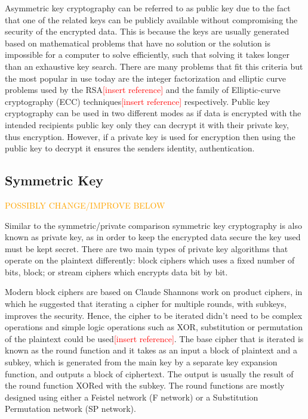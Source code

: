 \documentclass[12pt,twoside,a4paper]{report}
\begin{document}
    Asymmetric key cryptography can be referred to as public key due to the fact that one of the related keys can be publicly available without compromising the security of the encrypted data. This is because the keys are usually generated based on mathematical problems that have no solution or the solution is impossible for a computer to solve efficiently, such that solving it takes longer than an exhaustive key search\cite{BruceSchneier2000}. There are many problems that fit this criteria but the most popular in use today are the integer factorization and elliptic curve problems used by the RSA\textcolor{red}{[insert reference]} and the family of Elliptic-curve cryptography (ECC) techniques\textcolor{red}{[insert reference]} respectively. Public key cryptography can be used in two different modes as if data is encrypted with the intended recipients public key only they can decrypt it with their private key, thus encryption. However, if a private key is used for encryption then using the public key to decrypt it ensures the senders identity, authentication\cite{AlfredJ.Menezes1996}.
    
    \subsection{Symmetric Key}
    \textcolor{orange}{POSSIBLY CHANGE/IMPROVE BELOW}
    
    Similar to the symmetric/private comparison symmetric key cryptography is also known as private key, as in order to keep the encrypted data secure the key used must be kept secret. There are two main types of private key algorithms that operate on the plaintext differently: block ciphers which uses a fixed number of bits, block; or stream ciphers which encrypts data bit by bit\cite{AlfredJ.Menezes1996}.
    
    Modern block ciphers are based on Claude Shannons work on product ciphers\cite{Shannon1949}, in which he suggested that iterating a cipher for multiple rounds, with subkeys, improves the security. Hence, the cipher to be iterated didn't need to be complex operations and simple logic operations such as XOR, substitution or permutation of the plaintext could be used\textcolor{red}{[insert reference]}. The base cipher that is iterated is known as the round function and it takes as an input a block of plaintext and a subkey, which is generated from the main key by a separate key expansion function, and outputs a block of ciphertext. The output is usually the result of the round function XORed with the subkey. The round functions are mostly designed using either a Feistel network\cite{Feistel1973} (F network) or a Substitution Permutation network (SP network)\cite{AlfredJ.Menezes1996}.
    
\end{document}
